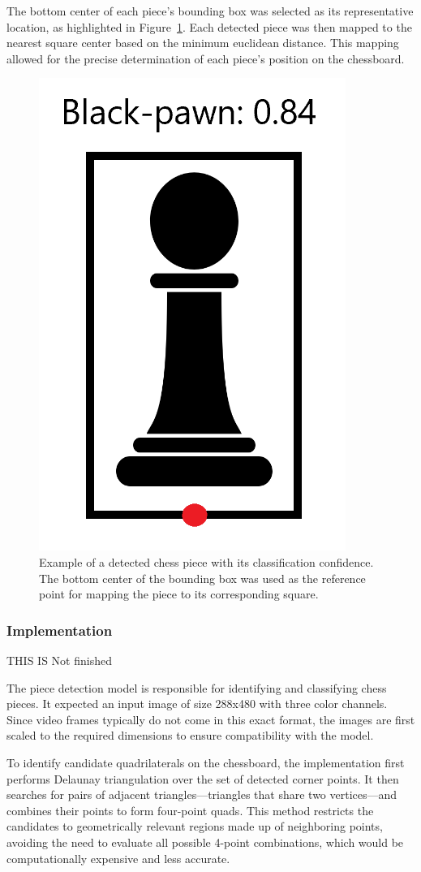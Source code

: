 The bottom center of each piece’s bounding box was selected as its representative location, as highlighted in Figure~\ref{fig:bbox-black-pawn}. Each detected piece was then mapped to the nearest square center based on the minimum euclidean distance. This mapping allowed for the precise determination of each piece's position on the chessboard.



\newpage

\begin{figure}[h!]
    \centering
    \includegraphics[width=0.25\linewidth]{figures/methods/ml-models/black-pawn.png}
    \caption[FIX]{Example of a detected chess piece with its classification confidence. The bottom center of the bounding box was used as the reference point for mapping the piece to its corresponding square. \cite{svgrepo:black-pawn-svg}}
    \label{fig:bbox-black-pawn}
\end{figure}

\subsubsection*{Implementation}

THIS IS Not finished

The piece detection model is responsible for identifying and classifying chess pieces. It expected an input image of size 288x480 with three color channels. Since video frames typically do not come in this exact format, the images are first scaled to the required dimensions to ensure compatibility with the model.

To identify candidate quadrilaterals on the chessboard, the implementation first performs Delaunay triangulation over the set of detected corner points. It then searches for pairs of adjacent triangles—triangles that share two vertices—and combines their points to form four-point quads. This method restricts the candidates to geometrically relevant regions made up of neighboring points, avoiding the need to evaluate all possible 4-point combinations, which would be computationally expensive and less accurate.



